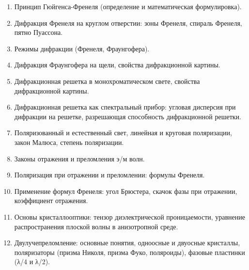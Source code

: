 \documentclass[12pt]{article}
\begin{document}
\begin{enumerate}
    \item Принцип Гюйгенса-Френеля (определение и математическая формулировка).

    \item Дифракция Френеля на круглом отверстии: зоны Френеля, спираль Френеля, пятно Пуассона.

    \item Режимы дифракции (Френеля, Фраунгофера).

    \item Дифракция Фраунгофера на щели, свойства дифракционной картины.

    \item Дифракционная решетка в монохроматическом свете, свойства дифракционной картины.

    \item Дифракционная решетка как спектральный прибор: угловая дисперсия при дифракции на решетке, разрешающая способность дифракционной решетки.

    \item Поляризованный и естественный свет, линейная и круговая поляризации, закон Малюса, степень поляризации.

    \item Законы отражения и преломления э/м волн.

    \item Поляризация при отражении и преломлении: формулы Френеля.

    \item Применение формул Френеля: угол Брюстера, скачок фазы при отражении, коэффициент отражения.

    \item Основы кристаллооптики: тензор диэлектрической проницаемости, уравнение распространения плоской волны в анизотропной среде.

    \item Двулучепреломление: основные понятия, одноосные и двуосные кристаллы, поляризаторы (призма Николя, призма Фуко, поляроиды), фазовые пластинки (λ/4 и λ/2).
\end{enumerate}

\end{document}
